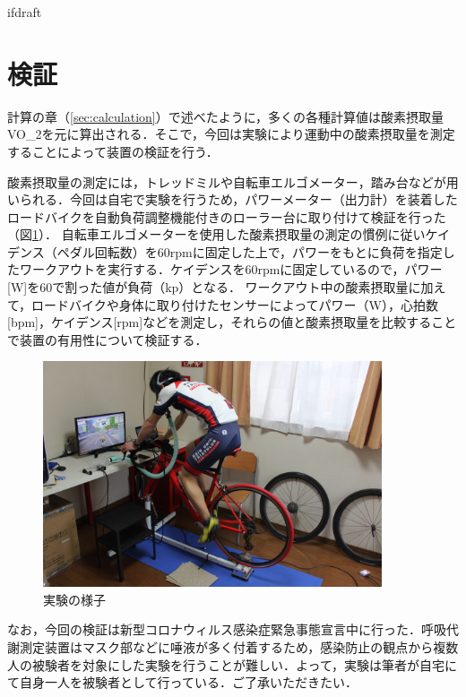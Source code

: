 \expandafter\ifx\csname ifdraft\endcsname\relax
 
\fi

\section{検証}

計算の章（\ref{sec:calculation}）で述べたように，多くの各種計算値は酸素摂取量VO_2を元に算出される．そこで，今回は実験により運動中の酸素摂取量を測定することによって装置の検証を行う．

酸素摂取量の測定には，トレッドミルや自転車エルゴメーター，踏み台などが用いられる．今回は自宅で実験を行うため，パワーメーター（出力計）を装着したロードバイクを自動負荷調整機能付きのローラー台に取り付けて検証を行った（図\ref{fig:bike_in_use}）．
自転車エルゴメーターを使用した酸素摂取量の測定の慣例に従いケイデンス（ペダル回転数）を60rpmに固定した上で，パワーをもとに負荷を指定したワークアウトを実行する．ケイデンスを60rpmに固定しているので，パワー[W]を60で割った値が負荷（kp）となる．
ワークアウト中の酸素摂取量に加えて，ロードバイクや身体に取り付けたセンサーによってパワー（W），心拍数[bpm]，ケイデンス[rpm]などを測定し，それらの値と酸素摂取量を比較することで装置の有用性について検証する．

\begin{figure}[H]
  \begin{center}
    \includegraphics[width=10cm]{fig/bike_in_use}
    \caption{実験の様子}
    \label{fig:bike_in_use}
  \end{center}
\end{figure}

なお，今回の検証は新型コロナウィルス感染症緊急事態宣言中に行った．呼吸代謝測定装置はマスク部などに唾液が多く付着するため，感染防止の観点から複数人の被験者を対象にした実験を行うことが難しい．よって，実験は筆者が自宅にて自身一人を被験者として行っている．ご了承いただきたい．

